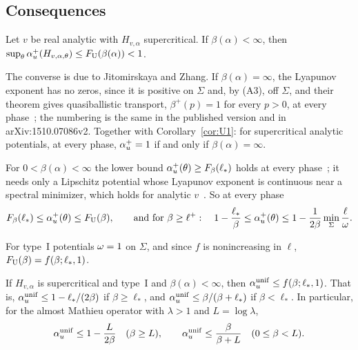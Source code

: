 \subsection{Consequences}

\begin{corollary}\label{cor:U1}
Let $v$ be real analytic with $H_{v,\alpha}$ supercritical. If $\beta(\alpha)<\infty$, then $\sup_\theta\alpha_u^+(H_{v,\alpha,\theta})\le F_{\mathrm U}(\beta(\alpha))<1$.
\end{corollary}

\begin{remark}\label{rem:endpoint}
The converse is due to Jitomirskaya and Zhang. If $\beta(\alpha)=\infty$, the Lyapunov exponent has no zeros, since it is positive on $\Sigma$ and, by (A3), off $\Sigma$, and their theorem gives quasiballistic transport, $\beta^+(p)=1$ for every $p>0$, at every phase~\cite[Theorem~3(2)]{JZ2022}; the numbering is the same in the published version and in arXiv:1510.07086v2. Together with Corollary~\ref{cor:U1}: for supercritical analytic potentials, at every phase, $\alpha_u^+=1$ if and only if $\beta(\alpha)=\infty$.
\end{remark}

\begin{remark}\label{rem:bracket}
For $0<\beta(\alpha)<\infty$ the lower bound $\alpha_u^+(\theta)\ge F_\beta(\ell_*)$ holds at every phase~\cite[Theorem~4.1]{DMuniv}; it needs only a Lipschitz potential whose Lyapunov exponent is continuous near a spectral minimizer, which holds for analytic $v$~\cite{BourgainJitomirskaya2002}. So at every phase
\[
F_\beta(\ell_*)\le\alpha_u^+(\theta)\le F_{\mathrm U}(\beta),\qquad\text{and for }\beta\ge\ell^+:\quad1-\frac{\ell_*}\beta\le\alpha_u^+(\theta)\le1-\frac1{2\beta}\min_\Sigma\frac\ell{\omega} .
\]
\end{remark}

For type~I potentials $\omega=1$ on $\Sigma$, and since $f$ is nonincreasing in $\ell$, $F_{\mathrm U}(\beta)=f(\beta;\ell_*,1)$.

\begin{corollary}[Type~I]\label{cor:typeI}
If $H_{v,\alpha}$ is supercritical and type~I and $\beta(\alpha)<\infty$, then $\alpha_u^{\mathrm{unif}}\le f(\beta;\ell_*,1)$. That is, $\alpha_u^{\mathrm{unif}}\le1-\ell_*/(2\beta)$ if $\beta\ge\ell_*$, and $\alpha_u^{\mathrm{unif}}\le\beta/(\beta+\ell_*)$ if $\beta<\ell_*$. In particular, for the almost Mathieu operator with $\lambda>1$ and $L=\log\lambda$,
\[
\alpha_u^{\mathrm{unif}}\le1-\frac{L}{2\beta}\quad(\beta\ge L),\qquad\alpha_u^{\mathrm{unif}}\le\frac{\beta}{\beta+L}\quad(0\le\beta<L).
\]
\end{corollary}

